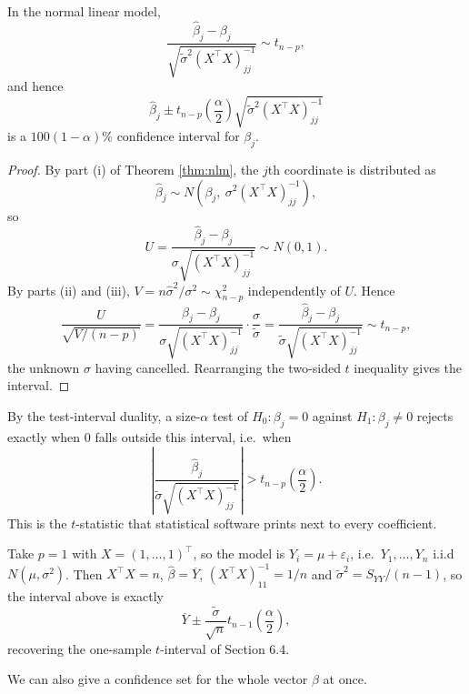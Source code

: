 \documentclass[a4paper]{scrartcl}
\begin{document}
\begin{proposition}
  In the normal linear model,
  $$
  \frac{\hat\beta_j - \beta_j}{\sqrt{\tilde\sigma^2\left(X^\top X\right)^{-1}_{jj}}}\sim t_{n-p},
  $$
  and hence
  $$
  \hat\beta_j \pm t_{n-p}\!\left(\frac\alpha2\right)\sqrt{\tilde\sigma^2\left(X^\top X\right)^{-1}_{jj}}
  $$
  is a $100(1-\alpha)\%$ confidence interval for $\beta_j$.
\end{proposition}
\begin{proof}
  By part (i) of Theorem \ref{thm:nlm}, the $j$th coordinate is distributed as
  $$
  \hat\beta_j \sim N\left(\beta_j,\ \sigma^2(X^\top X)^{-1}_{jj}\right),
  $$
  so
  $$
  U = \frac{\hat\beta_j - \beta_j}{\sigma\sqrt{(X^\top X)^{-1}_{jj}}} \sim N(0,1).
  $$
  By parts (ii) and (iii), $V = n\hat\sigma^2/\sigma^2 \sim \chi^2_{n-p}$ independently of $U$. Hence
  $$
  \frac{U}{\sqrt{V/(n-p)}} = \frac{\hat\beta_j-\beta_j}{\sigma\sqrt{(X^\top X)^{-1}_{jj}}}\cdot\frac{\sigma}{\tilde\sigma} = \frac{\hat\beta_j-\beta_j}{\tilde\sigma\sqrt{(X^\top X)^{-1}_{jj}}}\sim t_{n-p},
  $$
  the unknown $\sigma$ having cancelled. Rearranging the two-sided $t$ inequality gives the interval.
\end{proof}

By the test-interval duality, a size-$\alpha$ test of $H_0 : \beta_j = 0$ against $H_1 : \beta_j \neq 0$ rejects exactly when $0$ falls outside this interval, i.e.\ when
$$
\left|\frac{\hat\beta_j}{\tilde\sigma\sqrt{(X^\top X)^{-1}_{jj}}}\right| > t_{n-p}\!\left(\frac\alpha2\right).
$$
This is the $t$-statistic that statistical software prints next to every coefficient.

\begin{example}
  Take $p = 1$ with $X = (1,\dots,1)^\top$, so the model is $Y_i = \mu + \varepsilon_i$, i.e.\ $Y_1,\dots,Y_n$ i.i.d $N(\mu,\sigma^2)$. Then $X^\top X = n$, $\hat\beta = \overline{Y}$, $(X^\top X)^{-1}_{11} = 1/n$ and $\tilde\sigma^2 = S_{YY}/(n-1)$, so the interval above is exactly
  $$
  \overline{Y}\pm\frac{\tilde\sigma}{\sqrt n}t_{n-1}\!\left(\frac\alpha2\right),
  $$
  recovering the one-sample $t$-interval of Section 6.4.
\end{example}

We can also give a confidence set for the whole vector $\beta$ at once.
\end{document}
